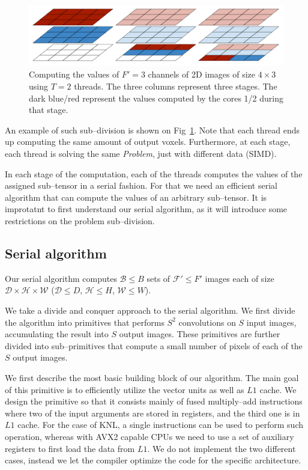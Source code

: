   \begin{figure}
    \begin{center}
      \includegraphics[width=0.97\linewidth]{fig/static2}
    \end{center}
    \caption{Computing the values of $F'=3$ channels of 2D images of
      size $4 \times 3$ using $T=2$ threads.  The three columns
      represent three stages.  The dark blue/red represent the values
      computed by the cores 1/2 during that stage.}
    \label{fig:problem-subdivision}
  \end{figure}

  An example of such sub--division is shown on
  Fig~\ref{fig:problem-subdivision}.  Note that each thread ends up
  computing the same amount of output voxels.  Furthermore, at each
  stage, each thread is solving the same \emph{Problem}, just with
  different data (SIMD).

  In each stage of the computation, each of the threads computes the
  values of the assigned sub--tensor in a serial fashion.  For that we
  need an efficient serial algorithm that can compute the values of an
  arbitrary sub--tensor.  It is improtatnt to first understand our
  serial algorithm, as it will introduce some restrictions on the
  problem sub--division.

  \subsection{Serial algorithm}

  Our serial algorithm computes $\mathcal{B} \le B$ sets of
  $\mathcal{F}' \le F'$ images each of size $\mathcal{D} \times
  \mathcal{H} \times \mathcal{W}$ ($\mathcal{D} \le D$, $\mathcal{H}
  \le H$, $\mathcal{W} \le W$).

  We take a divide and conquer approach to the serial algorithm.  We
  first divide the algorithm into primitives that performs $S^2$
  convolutions on $S$ input images, accumulating the result into $S$
  output images.  These primitives are further divided into
  sub--primitives that compute a small number of pixels of each of the
  $S$ output images.

  We first describe the most basic building block of our algorithm.
  The main goal of this primitive is to efficiently utilize the vector
  units as well as $L1$ cache.  We design the primitive so that it
  consists mainly of fused multiply--add instructions where two of the
  input arguments are stored in registers, and the third one is in
  $L1$ cache.  For the case of KNL, a single instructions can be used
  to perform such operation, whereas with AVX2 capable CPUs we need to
  use a set of auxiliary registers to first load the data from $L1$.
  We do not implement the two different cases, instead we let the
  compiler optimize the code for the specific architecture.

